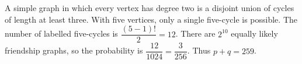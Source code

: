 A simple graph in which every vertex has degree two is a disjoint union of cycles of length at least three. With five vertices, only a single five-cycle is possible. The number of labelled five-cycles is $\dfrac{(5-1)!}{2}=12$. There are $2^{10}$ equally likely friendship graphs, so the probability is $\dfrac{12}{1024}=\dfrac{3}{256}$. Thus $\boxed{p+q=259}$.
